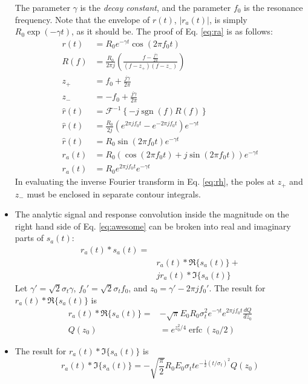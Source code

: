 \documentclass[amsmath,amssymb,aps,prd,10pt,twocolumn,showkeys]{revtex4}
\DeclareMathOperator\erfc{erfc}
\DeclareMathOperator{\sgn}{sgn}
\begin{document}
\begin{itemize}
The parameter $\gamma$ is the \textit{decay constant}, and the parameter $f_0$ is the resonance frequency.  Note that the envelope of $r(t)$, $|r_a(t)|$, is simply $R_0 \exp(-\gamma t)$, as it should be.  The proof of Eq. \ref{eq:ra} is as follows:
\begin{align}
r(t) &= R_0 e^{-\gamma t} \cos(2\pi f_0 t) \\
R(f) &= \frac{R_0}{2\pi j} \left( \frac{f - \frac{j\gamma}{2\pi}}{(f-z_+)(f-z_-)} \right) \\
z_+ &= f_0 + \frac{j\gamma}{2\pi} \\
z_- &= -f_0 + \frac{j\gamma}{2\pi} \\
\widehat{r}(t) &= \mathcal{F}^{-1}\left \lbrace - j \sgn(f) R(f) \right \rbrace \label{eq:rh} \\ 
\widehat{r}(t) &= \frac{R_0}{2j}\left( e^{2\pi j f_0 t} - e^{-2\pi j f_0 t} \right) e^{-\gamma t} \\
\widehat{r}(t) &= R_0 \sin(2\pi f_0 t) e^{-\gamma t} \\
r_a (t) &= R_0 \left(\cos(2\pi f_0 t) + j\sin(2\pi f_0 t)\right) e^{-\gamma t} \\
r_a (t) &= R_0 e^{2\pi j f_0 t} e^{-\gamma t}
\end{align}
In evaluating the inverse Fourier transform in Eq. \ref{eq:rh}, the poles at $z_+$ and $z_-$ must be enclosed in separate contour integrals.
\item The analytic signal and response convolution inside the magnitude on the right hand side of Eq. \ref{eq:awesome} can be broken into real and imaginary parts of $s_a(t)$:
\begin{align}
r_a (t) * s_a(t) = & \\ 
& r_a(t) * \Re\lbrace s_a(t)\rbrace + \\ 
& j r_a(t) * \Im\lbrace s_a(t)\rbrace
\end{align}
Let $\gamma' = \sqrt{2}\sigma_t \gamma$, $f_0' = \sqrt{2} \sigma_t f_0$, and $z_0 = \gamma' - 2\pi j f_0'$.  The result for $r_a(t) * \Re\lbrace s_a(t)\rbrace$ is
\begin{align}
r_a(t) * \Re\lbrace s_a(t)\rbrace =& -\sqrt{\pi} E_0 R_0 \sigma_t^2 e^{-\gamma t} e^{2\pi j f_0 t} \frac{dQ}{dz_0} \label{eq:result1} \\
Q(z_0) &= e^{z_0^2/4} \erfc(z_0/2) \label{eq:result2}
\end{align}
\item The result for $r_a(t) * \Im\lbrace s_a(t)\rbrace$ is
\begin{equation}
r_a(t) * \Im\lbrace s_a(t)\rbrace = -\sqrt{\frac{\pi}{2}} R_0 E_0 \sigma_t t e^{-\frac{1}{2}(t/\sigma_t)^2} Q(z_0) \label{eq:result3}

\end{equation}
\end{itemize}
\end{document}
